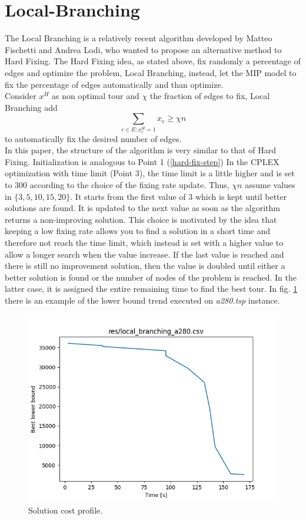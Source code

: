 \section{Local-Branching}
The Local Branching is a relatively recent algorithm developed by Matteo Fischetti and Andrea Lodi, who wanted to propose an alternative method to Hard Fixing. The Hard Fixing idea, as stated above, fix randomly a percentage of edges and optimize the problem, Local Branching, instead, let the MIP model to fix the percentage of edges automatically and than optimize. \\
Consider $ x^H $ as non optimal tour and $ \chi $ the fraction of edges to fix, Local Branching add
\begin{equation}
 \sum_{ e\in E: x_e^H = 1 } x_e \ge \chi n
\end{equation}
to automatically fix the desired number of edges. \\
In this paper, the structure of the algorithm is very similar to that of Hard Fixing. Initialization is analogous to Point 1 (\ref{hard-fix-step})
In the CPLEX optimization with time limit (Point 3), the time limit is a little higher and is set to 300 according to the choice of the fixing rate update. Thus, $ \chi n $ assume values in $ \{3, 5, 10, 15, 20\}$. It starts from the first value of 3 which is kept until better solutions are found. It is updated to the next value as soon as the algorithm returns a non-improving solution. This choice is motivated by the idea that keeping a low fixing rate allows you to find a solution in a short time and therefore not reach the time limit, which instead is set with a higher value to allow a longer search when the value increase. If the last value is reached and there is still no improvement solution, then the value is doubled until either a better solution is found or the number of nodes of the problem is reached. In the latter case, it is assigned the entire remaining time to find the best tour. In fig. \ref{fig:local_branching_a280} there is an example of the lower bound trend executed on \textit{a280.tsp} instance.\\
\begin{figure}[!h]
	\centering
	\includegraphics[width=0.5\columnwidth]{../res/local_branching_a280.png}
	\caption{Solution cost profile.}
	\label{fig:local_branching_a280}
\end{figure}

